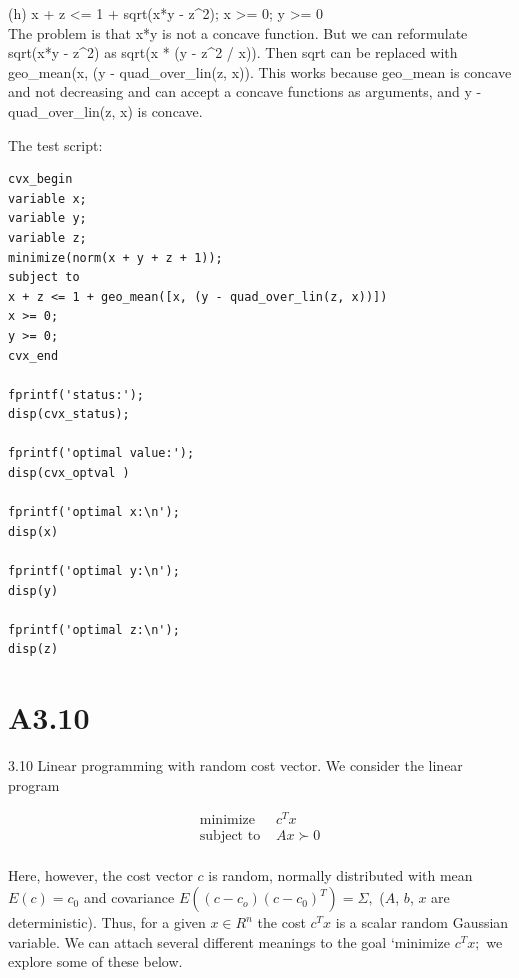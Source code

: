 \documentclass{article}
\begin{document}
(h) x + z <= 1 + sqrt(x*y - z\^{}2); x \textgreater= 0; y \textgreater= 0\\

The problem is that x*y is not a concave function. But we can reformulate sqrt(x*y - z\^{}2) as sqrt(x * (y - z\^{}2 / x)). Then sqrt can be replaced with geo\_mean(x, (y - quad\_over\_lin(z, x)). This works because geo\_mean is concave and not decreasing and can accept a concave functions as arguments, and  y - quad\_over\_lin(z, x) is concave.

The test script:\\
\begin{verbatim}
cvx_begin
variable x;
variable y;
variable z;
minimize(norm(x + y + z + 1));
subject to
x + z <= 1 + geo_mean([x, (y - quad_over_lin(z, x))])
x >= 0;
y >= 0;
cvx_end

fprintf('status:'); 
disp(cvx_status);

fprintf('optimal value:'); 
disp(cvx_optval )

fprintf('optimal x:\n'); 
disp(x)

fprintf('optimal y:\n'); 
disp(y)

fprintf('optimal z:\n'); 
disp(z)
\end{verbatim}

\section*{A3.10}

3.10 Linear programming with random cost vector. We consider the linear program 

\begin{align*}
\text{minimize } &c^T x \\
\text{subject to } &A x \succ 0 \\
\end{align*} 

Here, however, the cost vector $c$ is random, normally distributed with mean
$E(c) = c_0$ and covariance $E((c - c_o)(c - c_0)^T) = \Sigma, $ ($A$, $b$, $x$ are deterministic). Thus, for a given $x \in R^n$ the cost $c^T x$ is a scalar random Gaussian variable. We can attach several different meanings to the goal `minimize $c^T x;$ we explore some of these below.
\end{document}
